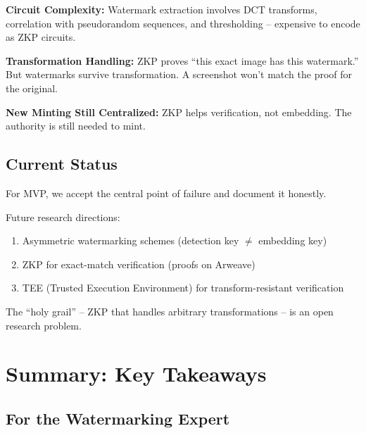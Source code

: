 \documentclass[11pt,a4paper]{article}
\begin{document}
\textbf{Circuit Complexity:} Watermark extraction involves DCT transforms, correlation with pseudorandom sequences, and thresholding -- expensive to encode as ZKP circuits.

\textbf{Transformation Handling:} ZKP proves ``this exact image has this watermark.'' But watermarks survive transformation. A screenshot won't match the proof for the original.

\textbf{New Minting Still Centralized:} ZKP helps verification, not embedding. The authority is still needed to mint.

\subsection{Current Status}

For MVP, we accept the central point of failure and document it honestly.

Future research directions:
\begin{enumerate}
    \item Asymmetric watermarking schemes (detection key $\neq$ embedding key)
    \item ZKP for exact-match verification (proofs on Arweave)
    \item TEE (Trusted Execution Environment) for transform-resistant verification
\end{enumerate}

The ``holy grail'' -- ZKP that handles arbitrary transformations -- is an open research problem.

\newpage
\section*{Summary: Key Takeaways}

\subsection*{For the Watermarking Expert}
\end{document}
